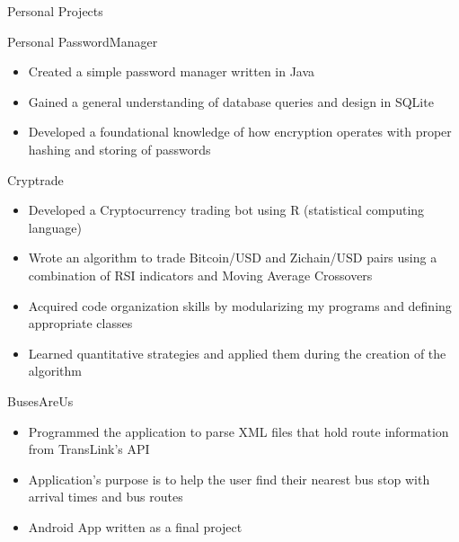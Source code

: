 \documentclass{article}
\newlength{\tabin}
\newlength{\secsep}
\newcommand{\lineunder}{\vspace*{-8pt} \\ \hspace*{-6pt} \hrulefill \\ \vspace*{-15pt}}
\newenvironment{tabbedsection}[1]{
  \begin{list}{}{
      \setlength{\itemsep}{0pt}
      \setlength{\labelsep}{0pt}
      \setlength{\labelwidth}{0pt}
      \setlength{\leftmargin}{\tabin}
      \setlength{\rightmargin}{\tabin}
      \setlength{\listparindent}{0pt}
      \setlength{\parsep}{0pt}
      \setlength{\parskip}{0pt}
      \setlength{\partopsep}{0pt}
      \setlength{\topsep}{#1}
    }
  \item[]
}{\end{list}}
\newenvironment{resume_section}[1]{
  \filbreak
  \vspace{2\secsep}
  \textsc{\large#1}
  \lineunder
  \begin{tabbedsection}{\secsep}
}{\end{tabbedsection}}
\newenvironment{resume_subsection}[2][]{
  \textbf{#2} \hfill {\footnotesize #1} \hspace{2em}
  \begin{tabbedsection}{0.5\secsep}
}{\end{tabbedsection}}
\newenvironment{subitems}{
  \renewcommand{\labelitemi}{-}
  \begin{itemize}
      \setlength{\labelsep}{1em}
}{\end{itemize}}
\begin{document}
\begin{resume_section}{Personal Projects}

\begin{resume_subsection}{Personal PasswordManager}
  \begin{subitems}
    \item Created a simple password manager written in Java
    \item Gained a general understanding of database queries and design in SQLite
    \item Developed a foundational knowledge of how encryption operates with proper hashing and storing of passwords
    \end{subitems}
  \end{resume_subsection}

    \begin{resume_subsection}{Cryptrade}
    \begin{subitems}
        \item Developed a Cryptocurrency trading bot using R (statistical computing language)
        \item Wrote an algorithm to trade Bitcoin/USD and Zichain/USD pairs using a combination of RSI indicators and Moving Average Crossovers
        \item Acquired code organization skills by modularizing my programs and defining appropriate classes
        \item Learned quantitative strategies and applied them during the creation of the algorithm
    \end{subitems}
  \end{resume_subsection}

  \begin{resume_subsection}[(July 2018)]{BusesAreUs}
     \begin{subitems}
     	\item Programmed the application to parse XML files that hold route information from TransLink's API
        \item Application's purpose is to help the user find their nearest bus stop with arrival times and bus routes
        \item Android App written as a final project
    \end{subitems}

  \end{resume_subsection}


\end{resume_section}
\end{document}
